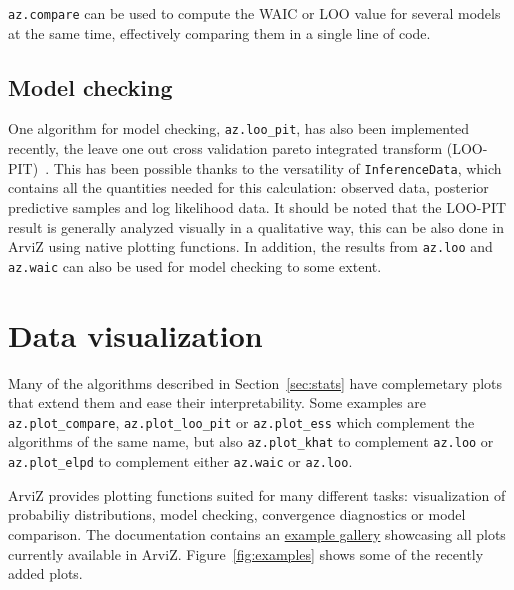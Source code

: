 \documentclass[anonymous=false, %
               format=acmsmall, %
               review=true, %
               screen=true, %
               nonacm=true]{acmart}
\begin{document}
\texttt{az.compare} can be used to compute the WAIC or LOO value for several
models at the same time, effectively comparing them in a single line of code.

\subsection{Model checking}
One algorithm for model checking, \texttt{az.loo\_pit}, has also been implemented
recently, the leave
one out cross validation pareto integrated transform
(LOO-PIT)~\cite{gabry2019visualization}. This has been possible thanks to the
versatility of \texttt{InferenceData}, which contains all the quantities
needed for this calculation: observed data, posterior predictive samples and
log likelihood data. It should be noted that the LOO-PIT result is generally
analyzed visually in a qualitative way, this can be also done in ArviZ using
native plotting functions. In addition, the results from \texttt{az.loo} and
\texttt{az.waic} can also be used for model checking to some extent.

\section{Data visualization}\label{sec:plots}
Many of the algorithms described in Section~\ref{sec:stats} have complemetary
plots that extend them and ease their interpretability. Some
examples are \texttt{az.plot\_compare}, \texttt{az.plot\_loo\_pit} or
\texttt{az.plot\_ess} which complement the algorithms of the same name, but
also \texttt{az.plot\_khat} to complement \texttt{az.loo} or
\texttt{az.plot\_elpd} to complement either \texttt{az.waic} or
\texttt{az.loo}.

ArviZ provides plotting functions suited for many different tasks:
visualization of probabiliy distributions, model checking, convergence
diagnostics or model comparison. The
documentation contains an
\href{https://arviz-devs.github.io/arviz/examples/index.html}{example gallery}
showcasing all plots currently available in ArviZ. Figure~\ref{fig:examples}
shows some of the recently added plots.
\end{document}
